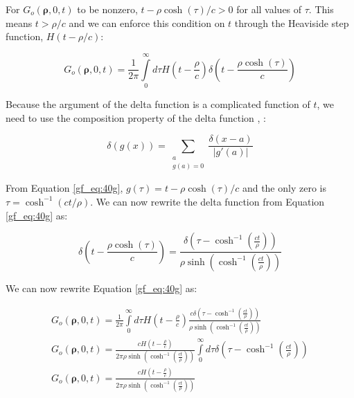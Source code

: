 For $G_o\left(\boldsymbol{\rho},0,t\right)$ to be nonzero, $t - \rho \cosh(\tau)/c > 0$ for all values of $\tau$. This means $t > \rho/c$ and we can enforce this condition on $t$ through the Heaviside step function, $H\left(t -\rho/c\right)$:

 \begin{equation}
G_o\left(\boldsymbol{\rho},0,t\right) = \frac{1}{2\pi}\int\limits_{0}^{\infty}d\tau H\left(t -\frac{\rho}{c}\right) \delta\left(t - \frac{\rho \cosh(\tau)}{c}\right)
\label{gf_eq:40g}
\end{equation}
 \renewcommand{\baselinestretch}{2} \small\normalsize
 
Because the argument of the delta function is a complicated function of $t$, we need to use the composition property of the delta function \cite{arfken_weber}, \cite{gbur_math}:

 \begin{equation}
\delta\left(g(x) \right) = \sum_{\substack{a \\g(a)=0}}\frac{\delta(x-a)}{|g'(a)|}
\label{gf_eq:40h}
\end{equation}
 \renewcommand{\baselinestretch}{2} \small\normalsize
 
From Equation \ref{gf_eq:40g}, $g(\tau) = t - \rho\cosh(\tau)/c$ and the only zero  is $\tau = \cosh^{-1}\left(ct/\rho\right)$. We can now rewrite the delta function from Equation \ref{gf_eq:40g} as:

 \begin{equation}
\delta\left(t - \frac{\rho \cosh(\tau)}{c}\right) = \frac{\delta\left(\tau -\cosh^{-1}\left(\frac{ct}{\rho} \right) \right)}{\rho\sinh\left(\cosh^{-1}\left(\frac{ct}{\rho} \right) \right)}
\label{gf_eq:40i}
\end{equation}
 \renewcommand{\baselinestretch}{2} \small\normalsize
 
\noindent We can now rewrite Equation \ref{gf_eq:40g} as:

 \begin{equation}
 \begin{gathered}
G_o\left(\boldsymbol{\rho},0,t\right) = \frac{1}{2\pi}\int\limits_{0}^{\infty}d\tau H\left(t -\frac{\rho}{c}\right)  \frac{c\delta\left(\tau -\cosh^{-1}\left(\frac{ct}{\rho} \right) \right)}{\rho\sinh\left(\cosh^{-1}\left(\frac{ct}{\rho} \right) \right)}\\
G_o\left(\boldsymbol{\rho},0,t\right) = \frac{cH\left(t -\frac{\rho}{c}\right)}{2\pi \rho\sinh\left(\cosh^{-1}\left(\frac{ct}{\rho} \right) \right)}\int\limits_{0}^{\infty}d\tau \delta\left(\tau -\cosh^{-1}\left(\frac{ct}{\rho} \right) \right)\\
G_o\left(\boldsymbol{\rho},0,t\right) = \frac{cH\left(t -\frac{\rho}{c}\right)}{2\pi \rho\sinh\left(\cosh^{-1}\left(\frac{ct}{\rho} \right) \right)}
\end{gathered}
\label{gf_eq:40j}
\end{equation}
 \renewcommand{\baselinestretch}{2} \small\normalsize
 
